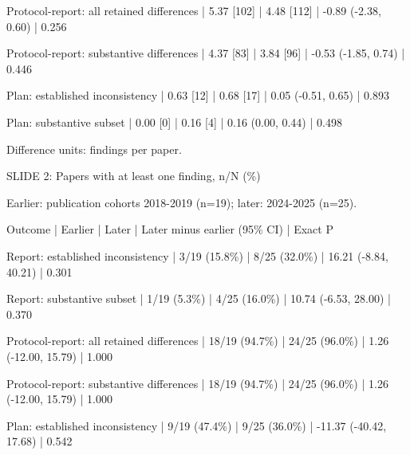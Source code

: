 \documentclass[10pt,a4paper]{article}
\begin{document}
Protocol-\allowbreak{}report: all retained differences | 5.\allowbreak{}37 [102] | 4.\allowbreak{}48 [112] | -\allowbreak{}0.\allowbreak{}89 (-\allowbreak{}2.\allowbreak{}38, 0.\allowbreak{}60) | 0.\allowbreak{}256\par
Protocol-\allowbreak{}report: substantive differences | 4.\allowbreak{}37 [83] | 3.\allowbreak{}84 [96] | -\allowbreak{}0.\allowbreak{}53 (-\allowbreak{}1.\allowbreak{}85, 0.\allowbreak{}74) | 0.\allowbreak{}446\par
Plan: established inconsistency | 0.\allowbreak{}63 [12] | 0.\allowbreak{}68 [17] | 0.\allowbreak{}05 (-\allowbreak{}0.\allowbreak{}51, 0.\allowbreak{}65) | 0.\allowbreak{}893\par
Plan: substantive subset | 0.\allowbreak{}00 [0] | 0.\allowbreak{}16 [4] | 0.\allowbreak{}16 (0.\allowbreak{}00, 0.\allowbreak{}44) | 0.\allowbreak{}498\par
Difference units: findings per paper.\allowbreak{}\par
SLIDE 2: Papers with at least one finding, n/\allowbreak{}N (\%)\par
Earlier: publication cohorts 2018-\allowbreak{}2019 (n=19); later: 2024-\allowbreak{}2025 (n=25).\allowbreak{}\par
Outcome | Earlier | Later | Later minus earlier (95\% CI) | Exact P\par
Report: established inconsistency | 3/\allowbreak{}19 (15.\allowbreak{}8\%) | 8/\allowbreak{}25 (32.\allowbreak{}0\%) | 16.\allowbreak{}21 (-\allowbreak{}8.\allowbreak{}84, 40.\allowbreak{}21) | 0.\allowbreak{}301\par
Report: substantive subset | 1/\allowbreak{}19 (5.\allowbreak{}3\%) | 4/\allowbreak{}25 (16.\allowbreak{}0\%) | 10.\allowbreak{}74 (-\allowbreak{}6.\allowbreak{}53, 28.\allowbreak{}00) | 0.\allowbreak{}370\par
Protocol-\allowbreak{}report: all retained differences | 18/\allowbreak{}19 (94.\allowbreak{}7\%) | 24/\allowbreak{}25 (96.\allowbreak{}0\%) | 1.\allowbreak{}26 (-\allowbreak{}12.\allowbreak{}00, 15.\allowbreak{}79) | 1.\allowbreak{}000\par
Protocol-\allowbreak{}report: substantive differences | 18/\allowbreak{}19 (94.\allowbreak{}7\%) | 24/\allowbreak{}25 (96.\allowbreak{}0\%) | 1.\allowbreak{}26 (-\allowbreak{}12.\allowbreak{}00, 15.\allowbreak{}79) | 1.\allowbreak{}000\par
Plan: established inconsistency | 9/\allowbreak{}19 (47.\allowbreak{}4\%) | 9/\allowbreak{}25 (36.\allowbreak{}0\%) | -\allowbreak{}11.\allowbreak{}37 (-\allowbreak{}40.\allowbreak{}42, 17.\allowbreak{}68) | 0.\allowbreak{}542\par
\end{document}
